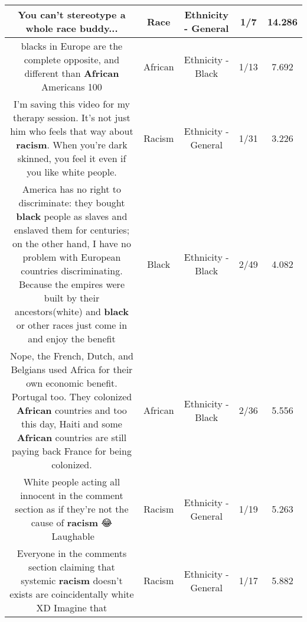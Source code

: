 \documentclass[11pt]{article}
\newlength\mylength
\begin{document}
\begin{center}
\begin{longtable}{|C{.65\mylength}|C{.30\mylength}|C{.12\mylength}|C{.12\mylength}|C{.12\mylength}|}
  \small You can't stereotype a whole \textbf{race} buddy...\normalsize   & Race & Ethnicity - General & 1/7 & 14.286 \\  \hline
  \small blacks in Europe are the complete opposite, and different than \textbf{African} Americans 100\normalsize   & African & Ethnicity - Black & 1/13 & 7.692 \\  \hline
  \small I'm saving this video for my therapy session. It's not just him who feels that way about \textbf{racism}. When you're dark skinned, you feel it even if you like white people.\normalsize   & Racism & Ethnicity - General & 1/31 & 3.226 \\  \hline
  \small America has no right to discriminate: they bought \textbf{black} people as slaves and enslaved them for centuries; on the other hand, I have no problem with European countries discriminating. Because the empires were built by their ancestors(white) and \textbf{black} or other races just come in and enjoy the benefit\normalsize   & Black & Ethnicity - Black & 2/49 & 4.082 \\  \hline
  \small Nope, the French, Dutch, and Belgians used Africa for their own economic benefit. Portugal too. They colonized \textbf{African} countries and too this day, Haiti and some \textbf{African} countries are still paying back France for being colonized.\normalsize   & African & Ethnicity - Black & 2/36 & 5.556 \\  \hline
  \small White people acting all innocent in the comment section as if they're not the cause of \textbf{racism} 😂💯Laughable\normalsize   & Racism & Ethnicity - General & 1/19 & 5.263 \\  \hline
  \small Everyone in the comments section claiming that systemic \textbf{racism} doesn't exists are coincidentally white XD Imagine that\normalsize   & Racism & Ethnicity - General & 1/17 & 5.882 \\  \hline

\end{longtable}
\end{center}
\end{document}
